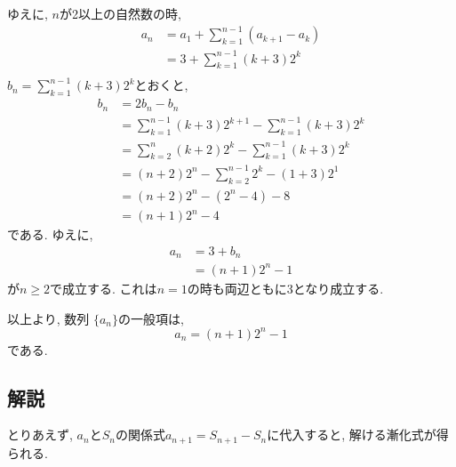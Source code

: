 \documentclass[dvipdfmx,a4paper]{jsarticle}
\newcommand{\2}{I\hspace{-1pt}I}
\newcommand{\3}{I\hspace{-1pt}I\hspace{-1pt}I}
\begin{document}
    ゆえに, $n$が2以上の自然数の時, 
    \begin{align*}
        a_n &= a_1 + \sum_{k=1}^{n-1} (a_{k+1} - a_k) \\
        &= 3 + \sum_{k=1}^{n-1} (k+3)2^k \\
    \end{align*}
    $\displaystyle b_n = \sum_{k=1}^{n-1} (k+3)2^k$とおくと, 
    \begin{align*}
        b_n &= 2b_n - b_n \\
        &= \sum_{k=1}^{n-1} (k+3)2^{k+1} - \sum_{k=1}^{n-1} (k+3)2^k \\
        &= \sum_{k=2}^{n} (k+2)2^{k} - \sum_{k=1}^{n-1} (k+3)2^k \\
        &= (n+2)2^n - \sum_{k=2}^{n-1} 2^{k} - (1+3)2^1 \\
        &= (n+2)2^n - (2^n-4) - 8 \\
        &= (n+1)2^n -4
    \end{align*}
    である. ゆえに, 
    \begin{align*}
        a_n &= 3 + b_n \\
        &= (n+1)2^n -1
    \end{align*}
    が$n \geq 2$で成立する. これは$n=1$の時も両辺ともに3となり成立する. 

    以上より, 数列 $\{a_n\}$の一般項は, 
    \begin{equation*}
        a_n= (n+1)2^n -1
    \end{equation*}
    である. 

    \subsection{解説}
    とりあえず, $a_n$と$S_n$の関係式$a_{n+1} = S_{n+1} - S_n$に代入すると, 
    解ける漸化式が得られる. 
\end{document}
